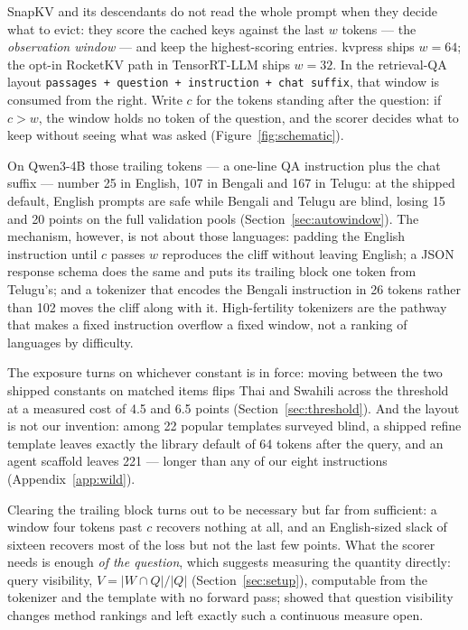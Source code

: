 \documentclass{article}
\begin{document}
SnapKV \citep{li2024snapkv} and its descendants do not read the whole
prompt when they decide what to evict: they score the cached keys against
the last $w$ tokens --- the \emph{observation window} ---
and keep the highest-scoring entries. kvpress ships
$w{=}64$; the opt-in RocketKV path in TensorRT-LLM ships $w{=}32$. In the retrieval-QA layout \texttt{passages + question +
instruction + chat suffix}, that window is consumed from the right.
Write $c$ for the tokens standing after the question: if $c > w$, the
window holds no token of the question, and the scorer decides what to
keep without seeing what was asked (Figure~\ref{fig:schematic}).

On Qwen3-4B those trailing tokens --- a one-line QA instruction plus
the chat suffix --- number 25 in English, 107 in Bengali and 167 in
Telugu: at the shipped default, English prompts are safe while Bengali
and Telugu are blind, losing 15 and 20 points on the full validation
pools (Section~\ref{sec:autowindow}). The mechanism, however, is not
about those languages: padding the English instruction until $c$ passes
$w$ reproduces the cliff without leaving English; a JSON response schema
does the same and puts its trailing block one token from Telugu's; and a
tokenizer that encodes the Bengali instruction in 26 tokens rather than
102 moves the cliff along with it.
High-fertility tokenizers are the pathway that makes a fixed instruction
overflow a fixed window, not a ranking of languages by difficulty.

The exposure turns on whichever constant is in force: moving between
the two shipped constants on matched items flips Thai and Swahili
across the threshold at a measured cost of 4.5 and 6.5 points
(Section~\ref{sec:threshold}). And the layout is not our invention:
among 22 popular templates surveyed blind, a shipped refine template
leaves exactly the library default of 64 tokens after the query, and
an agent scaffold leaves 221 --- longer than any of our eight
instructions (Appendix~\ref{app:wild}).

Clearing the trailing block turns out to be necessary but far from
sufficient: a window four tokens past $c$ recovers nothing at all, and
an English-sized slack of sixteen recovers most of the loss but not
the last few points. What the scorer needs is enough \emph{of the
question}, which suggests measuring the quantity directly: query
visibility, $V = |W \cap Q| / |Q|$ (Section~\ref{sec:setup}),
computable from the tokenizer and the template with no forward pass;
\citet{luo2026visibility} showed that question visibility changes
method rankings and left exactly such a continuous measure open.
\end{document}
